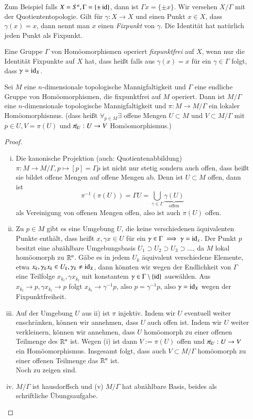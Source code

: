 \documentclass[a4paper,10pt]{scrartcl}
\begin{document}
Zum Beispiel falls $X=S^n, \Gamma=\{\pm \operatorname{id}\}$, dann ist $\Gamma x=\{\pm x\}$. Wir versehen $X/\Gamma$ mit der Quotiententopologie. Gilt für $\gamma:X\to X$ und einen Punkt $x\in X$, dass $\gamma(x)=x$, dann nennt man $x$ einen \emph{Fixpunkt} von $\gamma$. Die Identität hat natürlich jeden Punkt als Fixpunkt.
\begin{df}
 Eine Gruppe $\Gamma$ von Homöomorphismen operiert \emph{fixpunktfrei} auf $X$, wenn nur die Identität Fixpunkte auf $X$ hat, dass heißt falls aus $\gamma (x)=x$ für ein $\gamma\in \Gamma$ folgt, dass $\gamma=\operatorname{id}_X$.
\end{df}
\begin{st}\label{thm:7.4}
 Sei $M$ eine $n$-dimensionale topologische Mannigfaltigkeit und $\Gamma$ eine endliche Gruppe von Homöomorphismen, 
die fixpunktfrei auf $M$ operiert. Dann ist $M/\Gamma$ eine $n$-dimensionale topologische Mannigfaltigkeit 
und $\pi:M\to M/\Gamma$ ein lokaler Homöomorphismus. (dass heißt $\forall_{p\in M} \exists$ offene Mengen $U\subset M$ und $V\subset M/\Gamma$ mit $p\in U, V=\pi(U)$ und $\pi\vline_U: U\to V$ Homöomorphismus.)
\end{st}
\begin{proof}
 \begin{enumerate}[(i)]
  \item Die kanonische Projektion (auch: Quotientenabbildung) $\pi:M\to M/\Gamma, p\mapsto [p]=\Gamma p$ ist nicht nur stetig sondern auch offen, dass heißt sie bildet offene Mengen auf offene Mengen ab. Denn ist $U\subset M$ offen, dann ist 
\[
 \pi^{-1}(\pi(U))=\Gamma U=\bigcup\limits_{\gamma\in \Gamma} \underbrace{\gamma(U)}_{\text{offen}}
\]
als Vereinigung von offenen Mengen offen, also ist auch $\pi(U)$ offen.
\item Zu $p\in M$ gibt es eine Umgebung $U$, die keine verschiedenen äquivalenten Punkte enthält, dass heißt $x,\gamma x\in U$ für ein $\gamma\in \Gamma \implies \gamma=\operatorname{id}_x$.
Der Punkt $p$ besitzt eine abzählbare Umgebungsbasis $U_1\supset U_2 \supset U_3 \supset...$, da $M$ lokal homöomorph zu $\mathbb{R}^n$. Gäbe es in jedem $U_k$ äquivalent verschiedene Elemente, etwa $x_k, \gamma_k x_k\in U_k, \gamma_k\neq \operatorname{id}_X$,
dann könnten wir wegen der Endlichkeit von $\Gamma$ eine Teilfolge $x_{k_l}, \gamma x_{k_l}$ mit konstantem $\gamma\in \Gamma\setminus\{\operatorname{id}\}$ auswählen. Aus $x_{k_l}\to p, \gamma x_{k_l}\to p$ folgt $x_{k_l} \to \gamma^{-1} p$, also $p=\gamma^{-1} p$, also $\gamma=\operatorname{id}_X$ wegen der Fixpunktfreiheit.
\item Auf der Umgebung $U$ aus ii) ist $\pi$ injektiv. Indem wir $U$ eventuell weiter enschränken, können wir annehmen, dass $U$ auch offen ist.  Indem wir $U$ weiter verkleinern, können wir annehmen, dass $U$ homöomorph zu einer offenen Teilmenge des $\mathbb{R}^n$ ist. Wegen (i) ist dann $V:=\pi(U)$ offen und $\pi\vline_U:U\to V$ ein Homöomorphismus.  Insgesamt folgt, dass auch $V\subset M/\Gamma$ homöomorph zu einer offenen Teilmenge das $\mathbb{R}^n$ ist. \\
Noch zu zeigen sind.
\item $M/\Gamma$ ist hausdorffsch und (v) $M/\Gamma$ hat abzählbare Basis, beides als schriftliche Übungsaufgabe.  
\end{enumerate}
\end{proof}
\end{document}
